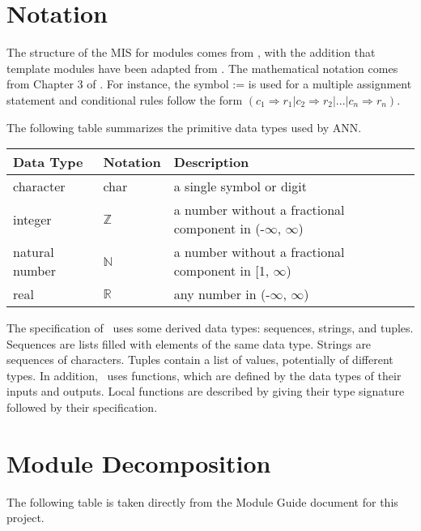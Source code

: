 \documentclass[12pt, titlepage]{article}
\begin{document}
\section{Notation}


The structure of the MIS for modules comes from \citet{HoffmanAndStrooper1995},
with the addition that template modules have been adapted from
\cite{GhezziEtAl2003}.  The mathematical notation comes from Chapter 3 of
\citet{HoffmanAndStrooper1995}.  For instance, the symbol := is used for a
multiple assignment statement and conditional rules follow the form $(c_1
\Rightarrow r_1 | c_2 \Rightarrow r_2 | ... | c_n \Rightarrow r_n )$.

The following table summarizes the primitive data types used by ANN. 

\begin{center}
\renewcommand{\arraystretch}{1.2}
\noindent 
\begin{tabular}{l l p{7.5cm}} 
\toprule 
\textbf{Data Type} & \textbf{Notation} & \textbf{Description}\\ 
\midrule
character & char & a single symbol or digit\\
integer & $\mathbb{Z}$ & a number without a fractional component in (-$\infty$, $\infty$) \\
natural number & $\mathbb{N}$ & a number without a fractional component in [1, $\infty$) \\
real & $\mathbb{R}$ & any number in (-$\infty$, $\infty$)\\
\bottomrule
\end{tabular} 
\end{center}

\noindent
The specification of \progname \ uses some derived data types: sequences, strings, and
tuples. Sequences are lists filled with elements of the same data type. Strings
are sequences of characters. Tuples contain a list of values, potentially of
different types. In addition, \progname \ uses functions, which
are defined by the data types of their inputs and outputs. Local functions are
described by giving their type signature followed by their specification.

\section{Module Decomposition}

The following table is taken directly from the Module Guide \cite{MG} document for this project.
\end{document}
